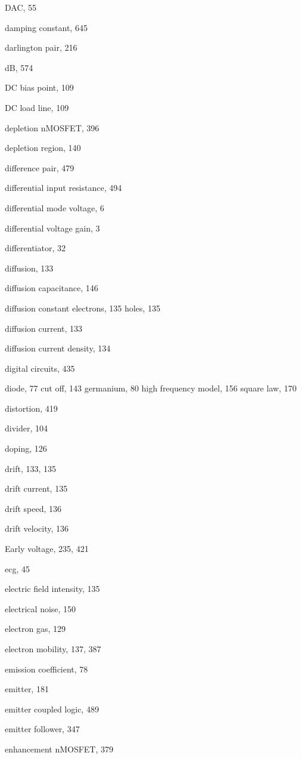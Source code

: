 \begin{theindex}
\begin{otherlanguage}{english}
  \item DAC, 55
  \item damping constant, 645
  \item darlington pair, 216
  \item dB, 574
  \item DC bias point, 109
  \item DC load line, 109
  \item depletion nMOSFET, 396
  \item depletion region, 140
  \item difference pair, 479
  \item differential input resistance, 494
  \item differential mode voltage, 6
  \item differential voltage gain, 3
  \item differentiator, 32
  \item diffusion, 133
  \item diffusion capacitance, 146
  \item diffusion constant
    \subitem  electrons, 135
    \subitem  holes, 135
  \item diffusion current, 133
  \item diffusion current density, 134
  \item digital circuits, 435
  \item diode, 77
    \subitem cut off, 143
    \subitem germanium, 80
    \subitem high frequency model, 156
    \subitem square law, 170
  \item distortion, 419
  \item divider, 104
  \item doping, 126
  \item drift, 133, 135
  \item drift current, 135
  \item drift speed, 136
  \item drift velocity, 136

  \indexspace

  \item Early voltage, 235, 421
  \item ecg, 45
  \item electric field intensity, 135
  \item electrical noise, 150
  \item electron gas, 129
  \item electron mobility, 137, 387
  \item emission coefficient, 78
  \item emitter, 181
  \item emitter coupled logic, 489
  \item emitter follower, 347
  \item enhancement nMOSFET, 379


\end{otherlanguage}
\end{theindex}
